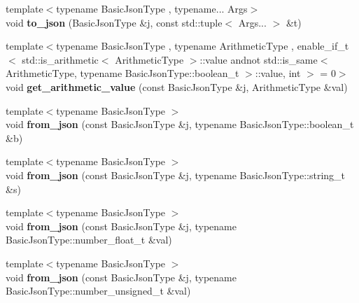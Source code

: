 \begin{DoxyCompactItemize}
\item 
{\footnotesize template$<$typename Basic\+Json\+Type , typename... Args$>$ }\\void {\bfseries to\+\_\+json} (Basic\+Json\+Type \&j, const std\+::tuple$<$ Args... $>$ \&t)\hypertarget{namespacenlohmann_1_1detail_aa7a47b08eee864c2c108c04954919648}{}\label{namespacenlohmann_1_1detail_aa7a47b08eee864c2c108c04954919648}

\item 
{\footnotesize template$<$typename Basic\+Json\+Type , typename Arithmetic\+Type , enable\+\_\+if\+\_\+t$<$ std\+::is\+\_\+arithmetic$<$ Arithmetic\+Type $>$\+::value andnot std\+::is\+\_\+same$<$ Arithmetic\+Type, typename Basic\+Json\+Type\+::boolean\+\_\+t $>$\+::value, int $>$  = 0$>$ }\\void {\bfseries get\+\_\+arithmetic\+\_\+value} (const Basic\+Json\+Type \&j, Arithmetic\+Type \&val)\hypertarget{namespacenlohmann_1_1detail_a85955b9c6dd31846e4b8e891f78614b6}{}\label{namespacenlohmann_1_1detail_a85955b9c6dd31846e4b8e891f78614b6}

\item 
{\footnotesize template$<$typename Basic\+Json\+Type $>$ }\\void {\bfseries from\+\_\+json} (const Basic\+Json\+Type \&j, typename Basic\+Json\+Type\+::boolean\+\_\+t \&b)\hypertarget{namespacenlohmann_1_1detail_a58117f225f43d03e3a0a4a6f3d77c9d9}{}\label{namespacenlohmann_1_1detail_a58117f225f43d03e3a0a4a6f3d77c9d9}

\item 
{\footnotesize template$<$typename Basic\+Json\+Type $>$ }\\void {\bfseries from\+\_\+json} (const Basic\+Json\+Type \&j, typename Basic\+Json\+Type\+::string\+\_\+t \&s)\hypertarget{namespacenlohmann_1_1detail_ad74d89f77ada7a57eff38b43d4bf2335}{}\label{namespacenlohmann_1_1detail_ad74d89f77ada7a57eff38b43d4bf2335}

\item 
{\footnotesize template$<$typename Basic\+Json\+Type $>$ }\\void {\bfseries from\+\_\+json} (const Basic\+Json\+Type \&j, typename Basic\+Json\+Type\+::number\+\_\+float\+\_\+t \&val)\hypertarget{namespacenlohmann_1_1detail_a7cb5dd7d46a60e65f9a8e0873b3f7dd8}{}\label{namespacenlohmann_1_1detail_a7cb5dd7d46a60e65f9a8e0873b3f7dd8}

\item 
{\footnotesize template$<$typename Basic\+Json\+Type $>$ }\\void {\bfseries from\+\_\+json} (const Basic\+Json\+Type \&j, typename Basic\+Json\+Type\+::number\+\_\+unsigned\+\_\+t \&val)\hypertarget{namespacenlohmann_1_1detail_ace4d5680ba413d9fd897ccb5d9c61a1c}{}\label{namespacenlohmann_1_1detail_ace4d5680ba413d9fd897ccb5d9c61a1c}


\end{DoxyCompactItemize}

